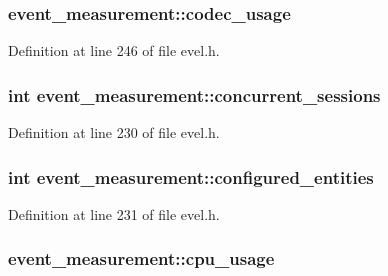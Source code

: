\subsubsection[{codec\+\_\+usage}]{ event\+\_\+measurement\+::codec\+\_\+usage}\label{structevent__measurement_a9ef619061bb0185c063ede94a114a73c}


Definition at line 246 of file evel.\+h.

\hypertarget{structevent__measurement_a96afa2ac61d0fade72e1645a284cfae6}{}
\subsubsection[{concurrent\+\_\+sessions}]{\setlength{\rightskip}{0pt plus 5cm}int event\+\_\+measurement\+::concurrent\+\_\+sessions}\label{structevent__measurement_a96afa2ac61d0fade72e1645a284cfae6}


Definition at line 230 of file evel.\+h.

\hypertarget{structevent__measurement_a4cb58272b32e5ec4e49d339f3f7b3677}{}
\subsubsection[{configured\+\_\+entities}]{\setlength{\rightskip}{0pt plus 5cm}int event\+\_\+measurement\+::configured\+\_\+entities}\label{structevent__measurement_a4cb58272b32e5ec4e49d339f3f7b3677}


Definition at line 231 of file evel.\+h.

\hypertarget{structevent__measurement_a1a727089e82e56bdd7d4a3aa6a55fa16}{}
\subsubsection[{cpu\+\_\+usage}]{ event\+\_\+measurement\+::cpu\+\_\+usage}\label{structevent__measurement_a1a727089e82e56bdd7d4a3aa6a55fa16}


